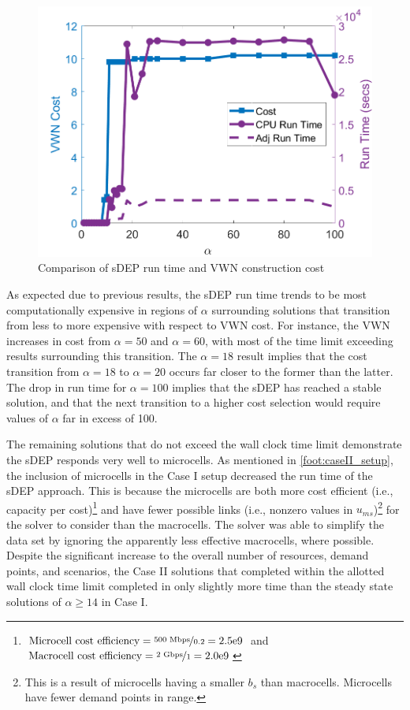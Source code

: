 \documentclass[12pt,dvipsnames]{report}
\newcommand{\expnumber}[2]{{#1}\mathrm{e}{#2}}
\begin{document}
\begin{figure}[htp]
	\centering
	\includegraphics[height=0.4\textheight]{Figures/CaseII_sDEPComparisonCostRuntime}
	\caption[Comparison of Case II sDEP approach run time and costs]{Comparison of sDEP run time and VWN construction cost}
	\label{fig:CaseII_sDEPComparisonCostRuntime}
\end{figure}

As expected due to previous results, the sDEP run time trends to be most computationally expensive in regions of $\alpha$ surrounding solutions that transition from less to more expensive with respect to VWN cost.  For instance, the VWN increases in cost from $\alpha = 50$ and $\alpha = 60$, with most of the time limit exceeding results surrounding this transition.  The $\alpha = 18$ result implies that the cost transition from $\alpha = 18$ to $\alpha = 20$ occurs far closer to the former than the latter.  The drop in run time for $\alpha = 100$ implies that the sDEP has reached a stable solution, and that the next transition to a higher cost selection would require values of $\alpha$ far in excess of 100.

The remaining solutions that do not exceed the wall clock time limit demonstrate the sDEP responds very well to microcells.  As mentioned in \cref{foot:caseII_setup}, the inclusion of microcells in the Case I setup decreased the run time of the sDEP approach.  This is because the microcells are both more cost efficient (i.e., capacity per cost)\footnote{$\text{Microcell cost efficiency} = \nicefrac{500 \text{ Mbps}}{0.2} = \expnumber{2.5}{9}$ and $\text{Macrocell cost efficiency} = \nicefrac{2 \text{ Gbps}}{1} = \expnumber{2.0}{9}$} and have fewer possible links (i.e., nonzero values in $u_{ms}$)\footnote{This is a result of microcells having a smaller $b_s$ than macrocells.  Microcells have fewer demand points in range.} for the solver to consider than the macrocells.  The solver was able to simplify the data set by ignoring the apparently less effective macrocells, where possible.  Despite the significant increase to the overall number of resources, demand points, and scenarios, the Case II solutions that completed within the allotted wall clock time limit completed in only slightly more time than the steady state solutions of $\alpha \geq 14$ in Case I.
\end{document}
